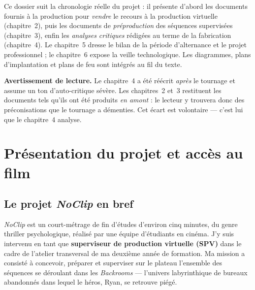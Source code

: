 \documentclass[11pt,a4paper]{report}
\begin{document}
\cleardoublepage
{\color{brdark}
\renewcommand{\contentsname}{Sommaire}
\setcounter{tocdepth}{1}
\tableofcontents}

\begin{infobox}[title={Guide de lecture}]
Ce dossier suit la chronologie réelle du projet : il présente d'abord les documents fournis à la production pour \emph{vendre} le recours à la production virtuelle (chapitre~2), puis les documents de \emph{préproduction} des séquences supervisées (chapitre~3), enfin les \emph{analyses critiques} rédigées au terme de la fabrication (chapitre~4). Le chapitre~5 dresse le bilan de la période d'alternance et le projet professionnel ; le chapitre~6 expose la veille technologique. Les diagrammes, plans d'implantation et plans de feu sont intégrés au fil du texte.

\medskip
\textbf{Avertissement de lecture.} Le chapitre~4 a été réécrit \emph{après} le tournage et assume un ton d'auto-critique sévère. Les chapitres~2 et~3 restituent les documents tels qu'ils ont été produits \emph{en amont} : le lecteur y trouvera donc des préconisations que le tournage a démenties. Cet écart est volontaire --- c'est lui que le chapitre~4 analyse.
\end{infobox}

\cleardoublepage
{}

\chapter{Présentation du projet et accès au film}

\section{Le projet \textit{NoClip} en bref}
\textit{NoClip} est un court-métrage de fin d'études d'environ cinq minutes, du genre thriller psychologique, réalisé par une équipe d'étudiants en cinéma. J'y suis intervenu en tant que \textbf{superviseur de production virtuelle (SPV)} dans le cadre de l'atelier transversal de ma deuxième année de formation. Ma mission a consisté à concevoir, préparer et superviser sur le plateau l'ensemble des séquences se déroulant dans les \emph{Backrooms} --- l'univers labyrinthique de bureaux abandonnés dans lequel le héros, Ryan, se retrouve piégé.
\end{document}
